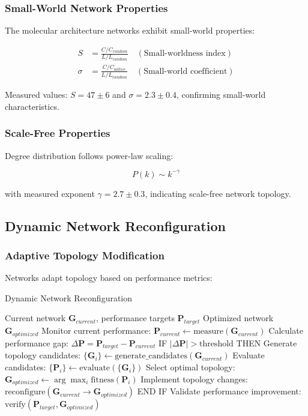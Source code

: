\subsubsection{Small-World Network Properties}

The molecular architecture networks exhibit small-world properties:

\begin{align}
S &= \frac{C/C_{random}}{L/L_{random}} \quad (\text{Small-worldness index}) \\
\sigma &= \frac{C/C_{lattice}}{L/L_{random}} \quad (\text{Small-world coefficient})
\end{align}

Measured values: $S = 47 \pm 6$ and $\sigma = 2.3 \pm 0.4$, confirming small-world characteristics.

\subsubsection{Scale-Free Properties}

Degree distribution follows power-law scaling:

\begin{equation}
P(k) \sim k^{-\gamma}
\end{equation}

with measured exponent $\gamma = 2.7 \pm 0.3$, indicating scale-free network topology.

\subsection{Dynamic Network Reconfiguration}

\subsubsection{Adaptive Topology Modification}

Networks adapt topology based on performance metrics:

\begin{algorithm}[H]
\caption{Dynamic Network Reconfiguration}
\begin{algorithmic}[1]
\REQUIRE Current network $\mathbf{G}_{current}$, performance targets $\mathbf{P}_{target}$
\ENSURE Optimized network $\mathbf{G}_{optimized}$
\STATE Monitor current performance: $\mathbf{P}_{current} \leftarrow \text{measure}(\mathbf{G}_{current})$
\STATE Calculate performance gap: $\Delta \mathbf{P} = \mathbf{P}_{target} - \mathbf{P}_{current}$
\STATE IF $|\Delta \mathbf{P}| > \text{threshold}$ THEN
\STATE \quad Generate topology candidates: $\{\mathbf{G}_i\} \leftarrow \text{generate\_candidates}(\mathbf{G}_{current})$
\STATE \quad Evaluate candidates: $\{\mathbf{P}_i\} \leftarrow \text{evaluate}(\{\mathbf{G}_i\})$
\STATE \quad Select optimal topology: $\mathbf{G}_{optimized} \leftarrow \arg\max_i \text{fitness}(\mathbf{P}_i)$
\STATE \quad Implement topology changes: $\text{reconfigure}(\mathbf{G}_{current} \rightarrow \mathbf{G}_{optimized})$
\STATE END IF
\STATE Validate performance improvement: $\text{verify}(\mathbf{P}_{target}, \mathbf{G}_{optimized})$
\end{algorithmic}
\end{algorithm}

